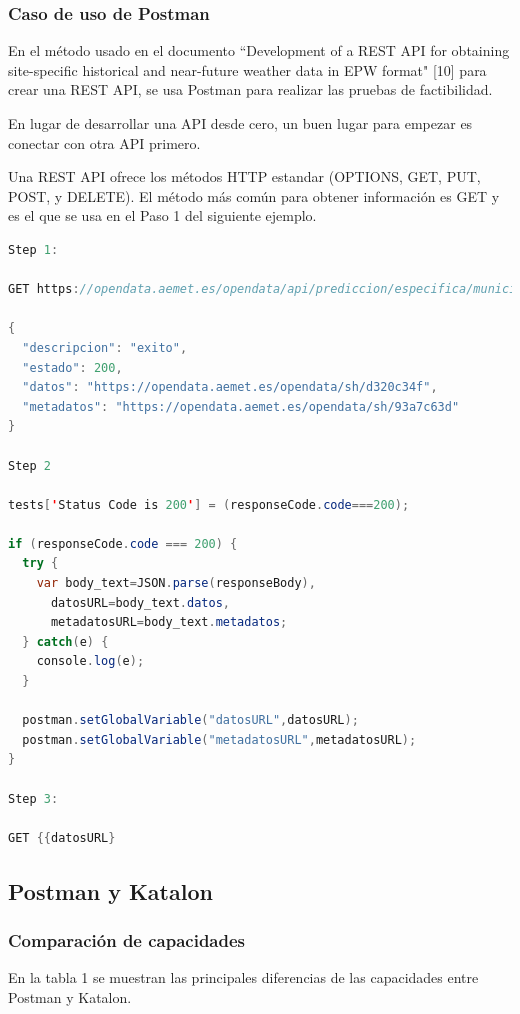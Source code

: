 \documentclass[twoside,twocolumn]{article}
\begin{document}
\subsubsection{Caso de uso de Postman}

En el método usado en el documento ``Development of a REST API for obtaining site-specific historical and near-future weather data in EPW format" [10] para crear una REST API, se usa Postman para realizar las pruebas de factibilidad.

En lugar de desarrollar una API desde cero, un buen lugar para empezar es conectar con otra API primero.

Una REST API ofrece los métodos HTTP estandar (OPTIONS, GET, PUT, POST, y DELETE). El método más común para obtener información es GET y es el que se usa en el Paso 1 del siguiente ejemplo.

\begin{lstlisting}[language=java]
Step 1:

GET https://opendata.aemet.es/opendata/api/prediccion/especifica/municipio/horaria/31201/?api_key={{AEMET_api_key}code}

{
  "descripcion": "exito",
  "estado": 200,
  "datos": "https://opendata.aemet.es/opendata/sh/d320c34f",
  "metadatos": "https://opendata.aemet.es/opendata/sh/93a7c63d"
}

Step 2

tests['Status Code is 200'] = (responseCode.code===200);

if (responseCode.code === 200) {
  try {
    var body_text=JSON.parse(responseBody),
      datosURL=body_text.datos,
      metadatosURL=body_text.metadatos;
  } catch(e) {
    console.log(e);
  }
  
  postman.setGlobalVariable("datosURL",datosURL);
  postman.setGlobalVariable("metadatosURL",metadatosURL);
}

Step 3:

GET {{datosURL}
\end{lstlisting}

\subsection{Postman y Katalon}

\subsubsection{Comparación de capacidades}

En la tabla 1 se muestran las principales diferencias de las capacidades entre Postman y Katalon.
\end{document}
